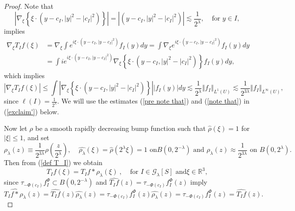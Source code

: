 \documentclass{amsart}%
\theoremstyle{plain}
\numberwithin{equation}{section}
\begin{document}
\begin{proof}
Note that%
\[
\left\vert \nabla_{\xi}\left\{  \xi\cdot\left(  y-c_{I},\left\vert
y\right\vert ^{2}-\left\vert c_{I}\right\vert ^{2}\right)  \right\}
\right\vert =\left\vert \left(  y-c_{I},\left\vert y\right\vert ^{2}%
-\left\vert c_{I}\right\vert ^{2}\right)  \right\vert \lesssim\frac
{1}{2^{\lambda}},\ \ \ \ \ \text{for }y\in I,
\]
implies%
\begin{align}
\nabla_{\xi}T_{I}f\left(  \xi\right)   &  =\nabla_{\xi}\int e^{i\xi
\cdot\left(  y-c_{I},\left\vert y-c_{I}\right\vert ^{2}\right)  }f_{I}\left(
y\right)  dy=\int\nabla_{\xi}e^{i\xi\cdot\left(  y-c_{I},\left\vert
y-c_{I}\right\vert ^{2}\right)  }f_{I}\left(  y\right)
dy\label{pre note that}\\
&  =\int ie^{i\xi\cdot\left(  y-c_{I},\left\vert y-c_{I}\right\vert
^{2}\right)  }\nabla_{\xi}\left\{  \xi\cdot\left(  y-c_{I},\left\vert
y\right\vert ^{2}-\left\vert c_{I}\right\vert ^{2}\right)  \right\}
f_{I}\left(  y\right)  dy,\nonumber
\end{align}
which implies%
\begin{equation}
\left\vert \nabla_{\xi}T_{I}f\left(  \xi\right)  \right\vert \leq
\int\left\vert \nabla_{\xi}\left\{  \xi\cdot\left(  y-c_{I},\left\vert
y\right\vert ^{2}-\left\vert c_{I}\right\vert ^{2}\right)  \right\}
\right\vert \left\vert f_{I}\left(  y\right)  \right\vert dy\lesssim\frac
{1}{2^{\lambda}}\left\Vert f_{I}\right\Vert _{L^{1}\left(  U\right)  }%
\lesssim\frac{1}{2^{3\lambda}}\left\Vert f_{I}\right\Vert _{L^{\infty}\left(
U\right)  },\label{note that}%
\end{equation}
since $\ell\left(  I\right)  =\frac{1}{2^{\lambda}}$. We will use the
estimates (\ref{pre note that}) and (\ref{note that}) in (\ref{exclaim'}) below.

Now let $\rho$ be a smooth rapidly decreasing bump function such that
$\widehat{\rho}\left(  \xi\right)  =1$ for $\left\vert \xi\right\vert \leq1$,
and set%
\[
\rho_{\lambda}\left(  z\right)  \equiv\frac{1}{2^{3\lambda}}\rho\left(
\frac{z}{2^{\lambda}}\right)  ,\ \ \ \ \ \widehat{\rho_{\lambda}}\left(
\xi\right)  =\widehat{\rho}\left(  2^{\lambda}\xi\right)  =1\text{ on
}B\left(  0,2^{-\lambda}\right)  \text{ and }\rho_{\lambda}\left(  z\right)
\approx\frac{1}{2^{3\lambda}}\text{ on }B\left(  0,2^{\lambda}\right)  .
\]
Then from (\ref{def T_I}) we obtain%
\[
T_{I}f\left(  \xi\right)  =T_{I}f\ast\rho_{\lambda}\left(  \xi\right)
\ ,\ \ \ \ \ \text{for }I\in\mathcal{G}_{\lambda}\left[  S\right]  \text{ and
}\xi\in\mathbb{R}^{3},
\]
since $\tau_{-\Phi\left(  c_{I}\right)  }f_{I}^{\Phi}\subset B\left(
0,2^{-\lambda}\right)  $ and $\widehat{T_{I}f}\left(  z\right)  =\tau
_{-\Phi\left(  c_{I}\right)  }f_{I}^{\Phi}\left(  z\right)  $ imply%
\[
\widehat{T_{I}f\ast\rho_{\lambda}}\left(  z\right)  =\widehat{T_{I}f}\left(
z\right)  \widehat{\rho_{\lambda}}\left(  z\right)  =\tau_{-\Phi\left(
c_{I}\right)  }f_{I}^{\Phi}\left(  z\right)  \widehat{\rho_{\lambda}}\left(
z\right)  =\tau_{-\Phi\left(  c_{I}\right)  }f_{I}^{\Phi}\left(  z\right)
=\widehat{T_{I}f}\left(  z\right)  .
\]



\end{proof}
\end{document}
